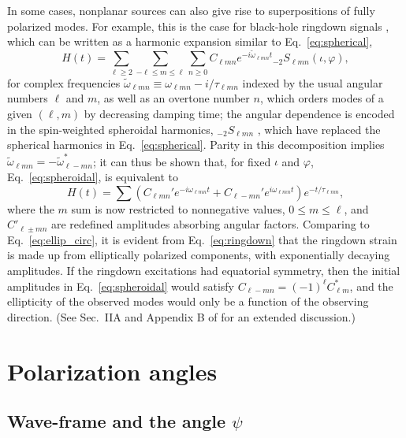 \documentclass[aps,prd,twocolumn,superscriptaddress,preprintnumbers,floatfix,nofootinbib]{revtex4-2}
\newcommand{\beq}{\begin{equation}}
\newcommand{\eeq}{\end{equation}}
\newcommand*{\eq}[1]{Eq.~\eqref{eq:#1}}
\begin{document}
In some cases, nonplanar sources can also give rise to superpositions of fully polarized modes.
For example, this is the case for black-hole ringdown signals \cite{Vishveshwara:1970cc, Press:1971wr, Teukolsky:1973ha, Chandrasekhar:1975zza}, which can be written as a harmonic expansion similar to \eq{spherical},
\beq \label{eq:spheroidal}
H(t) = \sum_{\ell \geq 2} \sum_{-\ell \leq m \leq \ell} \sum_{n\geq 0} C_{\ell m n} e^{-i\tilde{\omega}_{\ell m n} t} {}_{-2}S_{\ell m n} (\iota, \varphi) ,
\eeq
for complex frequencies $\tilde{\omega}_{\ell m n} \equiv \omega_{\ell m n} - i/\tau_{\ell m n}$ indexed by the usual angular numbers $\ell$ and $m$, as well as an overtone number $n$, which orders modes of a given $(\ell, m)$ by decreasing damping time; the angular dependence is encoded in the spin-weighted spheroidal harmonics, ${}_{-2}S_{\ell m n}$ \cite{Teukolsky:1973ha,Press:1973zz,Leaver:1985ax,Berti:2005gp,Cook:2014cta}, which have replaced the spherical harmonics in \eq{spherical}.
Parity in this decomposition implies $\tilde{\omega}_{\ell m n} = -\tilde{\omega}_{\ell-m n}^*$; it can thus be shown that, for fixed $\iota$ and $\varphi$, \eq{spheroidal}, is equivalent to
\beq \label{eq:ringdown}
H(t) = \sum \left( C_{\ell m n}' e^{-i\omega_{\ell m n} t} + C_{\ell -m n}' e^{i\omega_{\ell m n} t} \right) e^{-t/\tau_{\ell m n}} ,
\eeq
where the $m$ sum is now restricted to nonnegative values, $0 \leq m \leq \ell$, and $C'_{\ell \pm m n}$ are redefined amplitudes absorbing angular factors.
Comparing to \eq{ellip_circ}, it is evident from \eq{ringdown} that the ringdown strain is made up from elliptically polarized components, with exponentially decaying amplitudes.
If the ringdown excitations had equatorial symmetry, then the initial amplitudes in \eq{spheroidal} would satisfy $C_{\ell -m n }= (-1)^{\ell} C^*_{\ell m}$, and the ellipticity of the observed modes would only be a function of the observing direction.
(See Sec.~IIA and Appendix B of \cite{Isi:2021iql} for an extended discussion.)


\section{Polarization angles}
\label{sec:angles}

\subsection{Wave-frame and the angle $\psi$}
\label{sec:pol}
\end{document}
